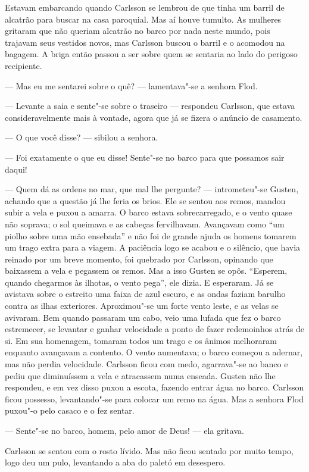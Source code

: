 Estavam embarcando quando Carlsson se lembrou de que tinha um barril de
alcatrão para buscar na casa paroquial. Mas aí houve tumulto. As mulheres
gritaram que não queriam alcatrão no barco por nada neste mundo, pois trajavam
seus vestidos novos, mas Carlsson buscou o barril e o acomodou na bagagem. A
briga então passou a ser sobre quem se sentaria ao lado do perigoso recipiente.

--- Mas eu me sentarei sobre o quê? --- lamentava"-se a senhora Flod.

--- Levante a saia e sente"-se sobre o traseiro --- respondeu Carlsson, que estava
consideravelmente mais à vontade, agora que já se fizera o anúncio de casamento.

--- O que você disse? --- sibilou a senhora.

--- Foi exatamente o que eu disse! Sente"-se no barco para que possamos sair
daqui!

--- Quem dá as ordens no mar, que mal lhe pergunte? --- intrometeu"-se Gusten, 
achando que a questão já lhe feria os brios. Ele se sentou aos remos, mandou
subir a vela e puxou a amarra. O barco estava sobrecarregado, e o vento
quase não soprava; o sol queimava e as cabeças fervilhavam. Avançavam como ``um
piolho sobre uma mão ensebada'' e não foi de grande ajuda os homens tomarem um
trago extra para a viagem. A paciência logo se acabou e o silêncio, que havia reinado por
um breve momento, foi quebrado por Carlsson, opinando que baixassem a vela e
pegassem os remos. Mas a isso Gusten se opôs. ``Esperem, quando chegarmos às
ilhotas, o vento pega'', ele dizia. E esperaram. Já se avistava sobre o estreito
uma faixa de azul escuro, e as ondas faziam barulho contra as ilhas exteriores.
Aproximou"-se um forte vento leste, e as velas se avivaram. Bem quando passaram
um cabo, veio uma lufada que fez o barco estremecer, se levantar e ganhar
velocidade a ponto de fazer redemoinhos atrás de si. Em sua homenagem, 
tomaram todos um trago e os ânimos melhoraram enquanto avançavam a contento. O
vento aumentava; o barco começou a adernar, mas não perdia velocidade.
Carlsson ficou com medo, agarrava"-se ao banco e pediu que diminuíssem a vela e
atracassem numa enseada. Gusten não lhe respondeu, e em vez disso puxou a escota,
fazendo entrar água no barco. Carlsson ficou possesso, levantando"-se para
colocar um remo na água. Mas a senhora Flod puxou"-o pelo casaco e o fez sentar.

--- Sente"-se no barco, homem, pelo amor de Deus! --- ela gritava.

Carlsson se sentou com o rosto lívido. Mas não ficou sentado por muito tempo,
logo deu um pulo, levantando a aba do paletó em desespero.

